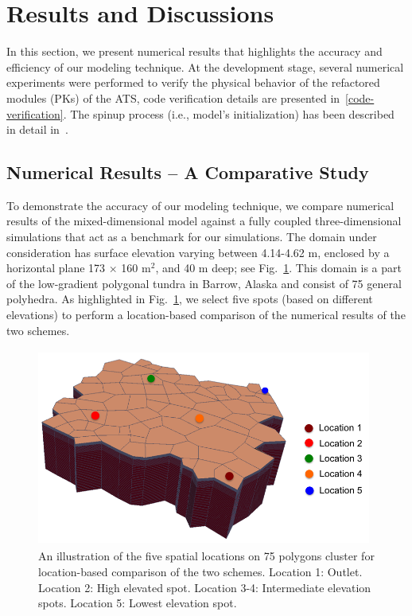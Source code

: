 \documentclass[review]{elsarticle}
\begin{document}
\section{Results and Discussions}\label{numerical-tests}

In this section, we present numerical results that highlights the accuracy and efficiency of our modeling technique. At the development stage, several numerical experiments were performed to verify the physical behavior of the refactored modules (PKs) of the ATS, code verification details are presented in~\ref{code-verification}. The spinup process (i.e., model's initialization) has been described in detail in~\cite{spainter2016integrated}. 


\subsection {Numerical Results -- A Comparative Study} 
To demonstrate the accuracy of our modeling technique, we compare numerical results of the mixed-dimensional model against a fully coupled three-dimensional simulations that act as a benchmark for our simulations. The domain under consideration has surface elevation varying between 4.14-4.62 m, enclosed by a horizontal plane 173 $\times$ 160 m$^2$, and 40 m deep; see Fig.~\ref{surf-location}. This domain is a part of the low-gradient polygonal tundra in Barrow, Alaska and consist of 75 general polyhedra. As highlighted in Fig.~\ref{surf-location}, we select five spots (based on different elevations) to perform a location-based comparison of the numerical results of the two schemes. 
\begin{figure}[!htpb]
\centering
\includegraphics[height = 6.5cm, width=11cm]{figures/lobster75-3d.png}
\caption{An illustration of the five spatial locations on 75 polygons cluster for location-based comparison of the two schemes. Location 1: Outlet. Location 2: High elevated spot. Location 3-4: Intermediate elevation spots. Location 5: Lowest elevation spot.}
\label{surf-location}
\end{figure}
\end{document}

